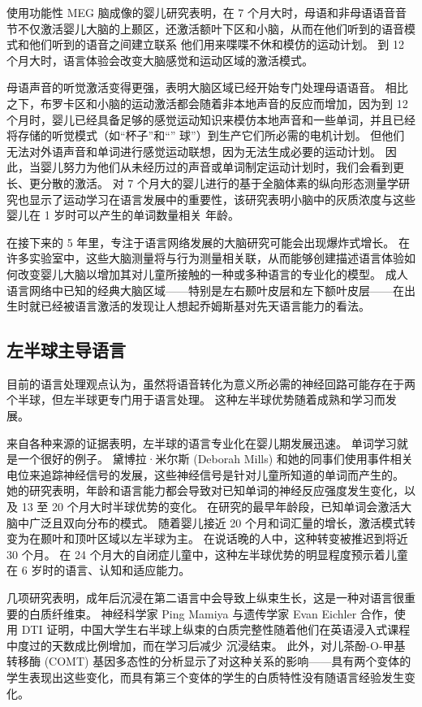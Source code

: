 使用功能性 MEG 脑成像的婴儿研究表明，在 7 个月大时，母语和非母语语音音节不仅激活婴儿大脑的上颞区，还激活额叶下区和小脑，从而在他们听到的语音模式和他们听到的语音之间建立联系 他们用来喋喋不休和模仿的运动计划。 到 12 个月大时，语言体验会改变大脑感觉和运动区域的激活模式。

母语声音的听觉激活变得更强，表明大脑区域已经开始专门处理母语语音。 相比之下，布罗卡区和小脑的运动激活都会随着非本地声音的反应而增加，因为到 12 个月时，婴儿已经具备足够的感觉运动知识来模仿本地声音和一些单词，并且已经将存储的听觉模式（如“杯子”和“” 球”）到生产它们所必需的电机计划。 但他们无法对外语声音和单词进行感觉运动联想，因为无法生成必要的运动计划。 因此，当婴儿努力为他们从未经历过的声音或单词制定运动计划时，我们会看到更长、更分散的激活。 对 7 个月大的婴儿进行的基于全脑体素的纵向形态测量学研究也显示了运动学习在语言发展中的重要性，该研究表明小脑中的灰质浓度与这些婴儿在 1 岁时可以产生的单词数量相关 年龄。

在接下来的 5 年里，专注于语言网络发展的大脑研究可能会出现爆炸式增长。 在许多实验室中，这些大脑测量将与行为测量相关联，从而能够创建描述语言体验如何改变婴儿大脑以增加其对儿童所接触的一种或多种语言的专业化的模型。 成人语言网络中已知的经典大脑区域——特别是左右颞叶皮层和左下额叶皮层——在出生时就已经被语言激活的发现让人想起乔姆斯基对先天语言能力的看法。

\subsection{左半球主导语言}
目前的语言处理观点认为，虽然将语音转化为意义所必需的神经回路可能存在于两个半球，但左半球更专门用于语言处理。 这种左半球优势随着成熟和学习而发展。

来自各种来源的证据表明，左半球的语言专业化在婴儿期发展迅速。 单词学习就是一个很好的例子。 黛博拉·米尔斯 (Deborah Mills) 和她的同事们使用事件相关电位来追踪神经信号的发展，这些神经信号是针对儿童所知道的单词而产生的。 她的研究表明，年龄和语言能力都会导致对已知单词的神经反应强度发生变化，以及 13 至 20 个月大时半球优势的变化。 在研究的最早年龄段，已知单词会激活大脑中广泛且双向分布的模式。 随着婴儿接近 20 个月和词汇量的增长，激活模式转变为在颞叶和顶叶区域以左半球为主。 在说话晚的人中，这种转变被推迟到将近 30 个月。 在 24 个月大的自闭症儿童中，这种左半球优势的明显程度预示着儿童在 6 岁时的语言、认知和适应能力。

几项研究表明，成年后沉浸在第二语言中会导致上纵束生长，这是一种对语言很重要的白质纤维束。 神经科学家 Ping Mamiya 与遗传学家 Evan Eichler 合作，使用 DTI 证明，中国大学生右半球上纵束的白质完整性随着他们在英语浸入式课程中度过的天数成比例增加，而在学习后减少 沉浸结束。 此外，对儿茶酚-O-甲基转移酶 (COMT) 基因多态性的分析显示了对这种关系的影响——具有两个变体的学生表现出这些变化，而具有第三个变体的学生的白质特性没有随语言经验发生变化。

